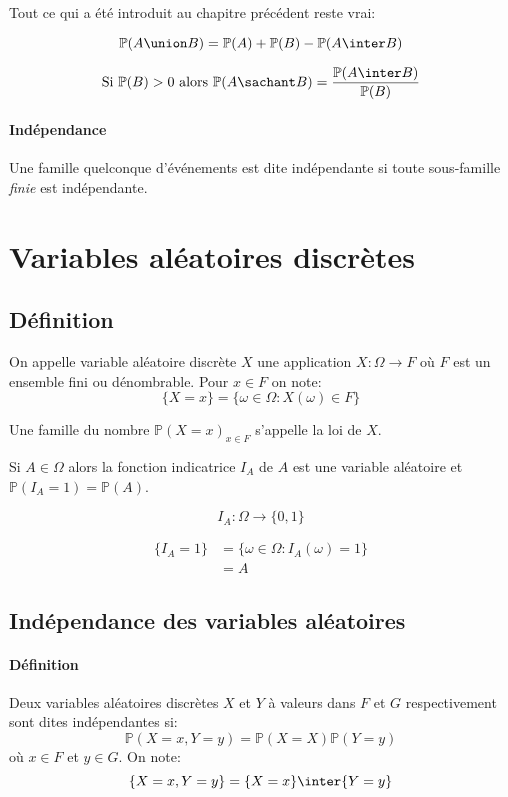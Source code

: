 \documentclass[a4paper,10pt,french,openany]{memoir}
\newcommand{\Proba}{\mathbb{P}}
\begin{document}
Tout ce qui a été introduit au chapitre précédent reste vrai:

\[ \Proba(A \union B) = \Proba(A) + \Proba(B) - \Proba(A \inter B) \]

\[ \text{Si } \Proba(B) > 0 \text{ alors } \Proba(A \sachant B) = \frac{\Proba(A \inter B)}{\Proba(B)} \]

\paragraph{Indépendance}
Une famille quelconque d'événements est dite indépendante si toute sous-famille \emph{finie} est indépendante.

\section{Variables aléatoires discrètes}

\subsection{Définition}
On appelle variable aléatoire discrète $X$ une application $X: \Omega \rightarrow F$ où $F$ est un ensemble fini ou dénombrable. Pour $x \in F$ on note:
\[ \{X=x\} = \{\omega \in \Omega: X(\omega) \in F\} \]

Une famille du nombre $\Proba(X=x)_{x \in F}$ s'appelle la loi de $X$.

Si $A \in \Omega$ alors la fonction indicatrice $I_A$ de $A$ est une variable aléatoire et $\Proba(I_A = 1) = \Proba(A)$.

\[I_A : \Omega \rightarrow \{0,1\}\]

\begin{align*}
 \{I_A=1\} &= \{\omega \in \Omega: I_A(\omega)=1\}\\
           &= A
\end{align*}

\subsection{Indépendance des variables aléatoires}

\paragraph{Définition}
Deux variables aléatoires discrètes $X$ et $Y$ à valeurs dans $F$ et $G$ respectivement sont dites indépendantes si:
\[ \Proba(X=x, Y=y)=\Proba(X=X) \Proba(Y=y) \]
où $x\in F$ et $y \in G$. On note:
\[ \{X=x, Y=y\}=\{X=x\}\inter\{Y=y\} \]
\end{document}
